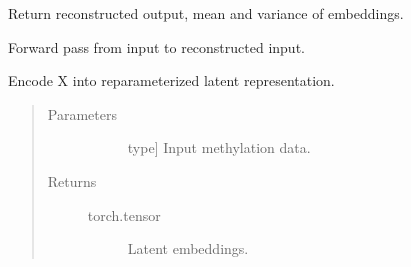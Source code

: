 \documentclass[letterpaper,10pt,english]{sphinxmanual}
\begin{document}
\begin{fulllineitems}
\begin{fulllineitems}
\label{\detokenize{index:methylnet.models.TybaltTitusVAE.forward}}
Return reconstructed output, mean and variance of embeddings.

\end{fulllineitems}


\begin{fulllineitems}
\label{\detokenize{index:methylnet.models.TybaltTitusVAE.forward_predict}}
Forward pass from input to reconstructed input.

\end{fulllineitems}


\begin{fulllineitems}
\label{\detokenize{index:methylnet.models.TybaltTitusVAE.get_latent_z}}
Encode X into reparameterized latent representation.
\begin{quote}\begin{description}
\item[{Parameters}] \leavevmode\begin{description}
\item[{}] \leavevmode{[}type{]}
Input methylation data.

\end{description}

\item[{Returns}] \leavevmode\begin{description}
\item[{torch.tensor}] \leavevmode
Latent embeddings.

\end{description}

\end{description}\end{quote}

\end{fulllineitems}


\end{fulllineitems}
\end{document}
